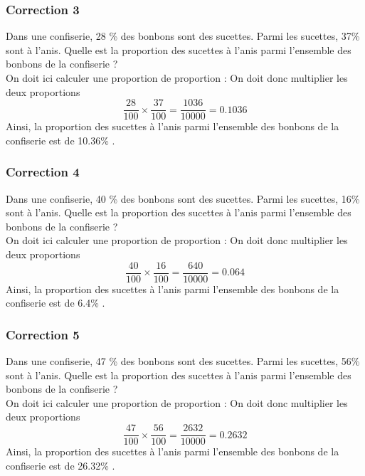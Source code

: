 \documentclass[15pt, mathserif]{beamer}
\begin{document}
\begin{frame}
\vspace{-10mm}
	\frametitle{Correction 3}
Dans une confiserie, 28 \% des bonbons sont des sucettes. Parmi les sucettes, 37\% sont à l'anis. Quelle est la proportion des sucettes à l'anis parmi l'ensemble des bonbons de la confiserie ?\\ On doit ici calculer une proportion de proportion : On doit donc multiplier les deux proportions $$ \dfrac{28}{100} \times \dfrac{37}{100} = \dfrac{1036}{10000} = 0.1036$$ Ainsi, la proportion des sucettes à l'anis parmi l'ensemble des bonbons de la confiserie  est de 10.36\% .\end{frame}


\begin{frame}
\vspace{-10mm}
	\frametitle{Correction 4}
Dans une confiserie, 40 \% des bonbons sont des sucettes. Parmi les sucettes, 16\% sont à l'anis. Quelle est la proportion des sucettes à l'anis parmi l'ensemble des bonbons de la confiserie ?\\ On doit ici calculer une proportion de proportion : On doit donc multiplier les deux proportions $$ \dfrac{40}{100} \times \dfrac{16}{100} = \dfrac{640}{10000} = 0.064$$ Ainsi, la proportion des sucettes à l'anis parmi l'ensemble des bonbons de la confiserie  est de 6.4\% .\end{frame}


\begin{frame}
\vspace{-10mm}
	\frametitle{Correction 5}
Dans une confiserie, 47 \% des bonbons sont des sucettes. Parmi les sucettes, 56\% sont à l'anis. Quelle est la proportion des sucettes à l'anis parmi l'ensemble des bonbons de la confiserie ?\\ On doit ici calculer une proportion de proportion : On doit donc multiplier les deux proportions $$ \dfrac{47}{100} \times \dfrac{56}{100} = \dfrac{2632}{10000} = 0.2632$$ Ainsi, la proportion des sucettes à l'anis parmi l'ensemble des bonbons de la confiserie  est de 26.32\% .\end{frame}
\end{document}
